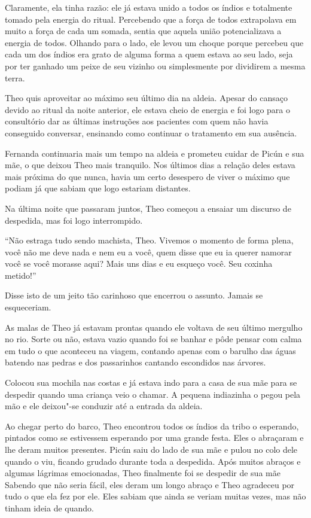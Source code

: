 Claramente, ela tinha razão: ele já estava unido a todos os índios e
totalmente tomado pela energia do ritual. Percebendo que a força de
todos extrapolava em muito a força de cada um somada, sentia que aquela união
potencializava a energia de todos. Olhando para o lado, ele levou um
choque porque percebeu que cada um dos índios era grato de alguma forma
a quem estava ao seu lado, seja por ter ganhado um peixe de seu vizinho
ou simplesmente por dividirem a mesma terra.

\asterisc


Theo quis aproveitar ao máximo seu último dia na aldeia. Apesar do
cansaço devido ao ritual da noite anterior, ele estava cheio de energia
e foi logo para o consultório dar as últimas instruções aos pacientes
com quem não havia conseguido conversar, ensinando como continuar o
tratamento em sua ausência.

Fernanda continuaria mais um tempo na aldeia e prometeu cuidar de Picún
e sua mãe, o que deixou Theo mais tranquilo. Nos últimos dias a relação
deles estava mais próxima do que nunca, havia um certo desespero de
viver o máximo que podiam já que sabiam que logo estariam distantes.

Na última noite que passaram juntos, Theo começou a ensaiar um discurso
de despedida, mas foi logo interrompido.

``Não estraga tudo sendo machista, Theo. Vivemos o momento de forma
plena, você não me deve nada e nem eu a você, quem disse que eu ia
querer namorar você se você morasse aqui? Mais uns dias e eu esqueço
você. Seu coxinha metido!''

Disse isto de um jeito tão carinhoso que encerrou o assunto. Jamais se
esqueceriam.

As malas de Theo já estavam prontas quando ele voltava de seu último
mergulho no rio. Sorte ou não, estava vazio quando foi se banhar e pôde
pensar com calma em tudo o que aconteceu na viagem, contando apenas com
o barulho das águas batendo nas pedras e dos passarinhos cantando
escondidos nas árvores.

Colocou sua mochila nas costas e já estava indo para a casa de sua mãe
para se despedir quando uma criança veio o chamar. A pequena indiazinha
o pegou pela mão e ele deixou"-se conduzir até a entrada da aldeia.

Ao chegar perto do barco, Theo encontrou todos os índios da tribo o
esperando, pintados como se estivessem esperando por uma grande festa.
Eles o abraçaram e lhe deram muitos presentes. Picún saiu do lado de sua
mãe e pulou no colo dele quando o viu, ficando grudado durante toda a
despedida. Após muitos abraços e algumas lágrimas emocionadas, Theo
finalmente foi se despedir de sua mãe Sabendo que não seria fácil, eles
deram um longo abraço e Theo agradeceu por tudo o que ela fez por ele.
Eles sabiam que ainda se veriam muitas vezes, mas não tinham ideia de
quando.

